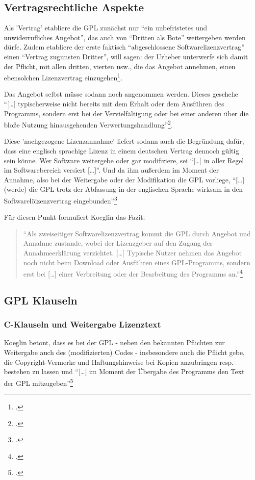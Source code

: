 \documentclass[DIV=calc,BCOR=5mm,11pt,headings=small,oneside,abstract=true, toc=bib]{scrartcl}
\begin{document}
\subsection{Vertragsrechtliche Aspekte}

Als 'Vertrag' etabliere die GPL zunächst nur \enquote{ein unbefristetes und
unwiderrufliches Angebot}, das auch von \enquote{Dritten als Bote}
weitergeben werden dürfe. Zudem etabliere der erste faktisch
\enquote{abgeschlossene Softwarelizenzvertrag} einen \enquote{Vertrag
zugunsten Dritter}, will sagen: der Urheber unterwerfe sich damit der
Pflicht, mit allen dritten, vierten usw., die das Angebot annehmen, einen
ebensolchen Lizenzvertrag einzugehen\footcite[vgl.][182]{Koglin2007a}.

Das Angebot selbst müsse sodann noch angenommen werden. Dieses geschehe
\enquote{[\ldots] typischerweise nicht bereits mit dem Erhalt oder dem
Ausführen des Programms, sondern erst bei der Vervielfältigung oder bei
einer anderen über die bloße Nutzung hinausgehenden
Verwertungshandlung}\footcite[vgl.][182]{Koglin2007a}.

Diese 'nachgezogene Lizenzannahme' liefert sodann auch die Begründung dafür,
dass eine englisch sprachige Lizenz in einem deutschen Vertrag dennoch gültig
sein könne. Wer Software weitergebe oder gar modifiziere, sei \enquote{[\ldots]
in aller Regel im Softwarebereich versiert [\ldots]}. Und da ihm
außerdem im Moment der Annahme, also bei der Weitergabe oder der Modifikation
die GPL vorliege, \enquote{[\ldots] (werde) die GPL trotz der Abfassung in
der englischen Sprache wirksam in den Softwarelöizenzvertrag
eingebunden}\footcite[vgl.][182f]{Koglin2007a}

Für diesen Punkt formuliert Koeglin das Fazit:

\begin{quote}\enquote{Als zweiseitiger Softwarelizenzvertrag kommt die GPL
durch Angebot und Annahme zustande, wobei der Lizenzgeber auf den Zugang
der Annahmeerklärung verzichtet. [\ldots] Typische Nutzer nehmen das
Angebot noch nicht beim Download oder Ausführen eines GPL-Programms,
sondern erst bei [\ldots] einer Verbreitung oder der Bearbeitung des
Programms an.}\footcite[][227]{Koglin2007a}
\end{quote}

\subsection{GPL Klauseln}

\subsubsection{C-Klauseln und Weitergabe Lizenztext}
Koeglin betont, dass es bei der GPL - neben den bekannten Pflichten zur
Weitergabe auch des (modifizierten) Codes - insbesondere auch die Pflicht gebe,
die Copyright-Vermerke und Haftungshinweise bei Kopien anzubringen resp.
bestehen zu lassen und \enquote{[\ldots] im Moment der Übergabe des Programms
den Text der GPL mitzugeben}\footcite[vgl.][192]{Koglin2007a}
\end{document}
